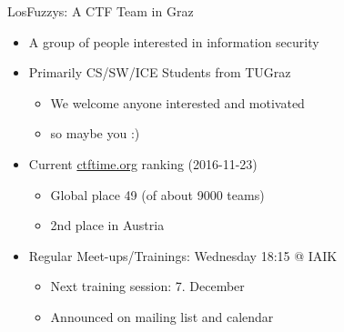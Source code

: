 \begin{frame}
  {LosFuzzys: A CTF Team in Graz}

  \begin{itemize}
    \item A group of people interested in information security
    \item Primarily CS/SW/ICE Students from TUGraz
      \begin{itemize}
        \item We welcome anyone interested and motivated
        \item so maybe you :)
      \end{itemize}
    \item Current \href{https://ctftime.org/team/8323}{ctftime.org} ranking
      (2016-11-23)
      \begin{itemize}
        \item Global place 49 (of about 9000 teams)
        \item 2nd place in Austria
      \end{itemize}
    \item Regular Meet-ups/Trainings: Wednesday 18:15 @ IAIK
      \begin{itemize}
        \item Next training session: 7. December
        \item Announced on mailing list and calendar
      \end{itemize}
  \end{itemize}
\end{frame}


